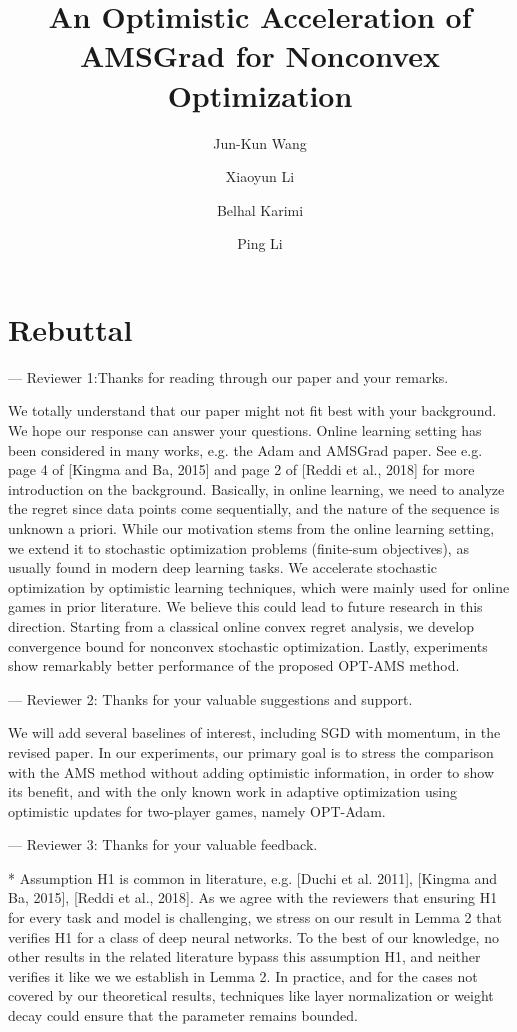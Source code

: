 \documentclass{article}
\title{An Optimistic Acceleration of AMSGrad for Nonconvex Optimization}
\author{Jun-Kun Wang \and Xiaoyun Li \and Belhal Karimi \and Ping Li}
\date{}
\begin{document}
\maketitle

\section{Rebuttal}



--- Reviewer 1:Thanks for reading through our paper and your remarks. 

We totally understand that our paper might not fit best with your background. We hope our response can answer your questions.
Online learning setting has been considered in many works, e.g. the Adam and AMSGrad paper. See e.g. page 4 of [Kingma and Ba, 2015] and page 2 of [Reddi et al., 2018] for more introduction on the background. 
Basically, in online learning, we need to analyze the regret since data points come sequentially, and the nature of the sequence is unknown a priori. 
While our motivation stems from the online learning setting, we extend it to stochastic optimization problems (finite-sum objectives), as usually found in modern deep learning tasks. 
We accelerate stochastic optimization by optimistic learning techniques, which were mainly used for online games in prior literature. 
We believe this could lead to future research in this direction. 
Starting from a classical online convex regret analysis, we develop convergence bound for nonconvex stochastic optimization. 
Lastly, experiments show remarkably better performance of the proposed OPT-AMS method.



--- Reviewer 2: Thanks for your valuable suggestions and support. 

We will add several baselines of interest, including SGD with momentum, in the revised paper. 
In our experiments, our primary goal is to stress the comparison with the AMS method without adding optimistic information, in order to show its benefit, and with the only known work in adaptive optimization using optimistic updates for two-player games, namely OPT-Adam.


--- Reviewer 3: Thanks for your valuable feedback.

* Assumption H1 is common in literature, e.g. [Duchi et al. 2011], [Kingma and Ba, 2015], [Reddi et al., 2018].
As we agree with the reviewers that ensuring H1 for every task and model is challenging, we stress on our result in Lemma 2 that verifies H1 for a class of deep neural networks. 
To the best of our knowledge, no other results in the related literature bypass this assumption H1, and neither verifies it like we we establish in Lemma 2. 
In practice, and for the cases not covered by our theoretical results, techniques like layer normalization or weight decay could ensure that the parameter remains bounded.
\end{document}
